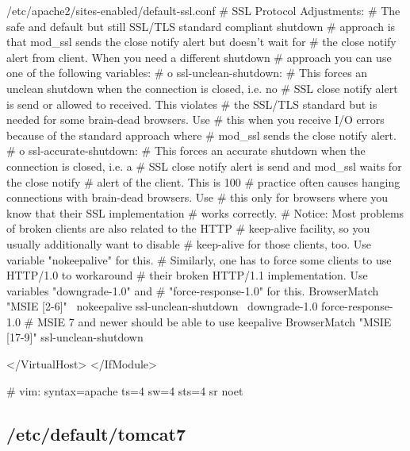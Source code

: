\begin{lstdump}[tabsize=2]{/etc/apache2/sites-enabled/default-ssl.conf}
		#   SSL Protocol Adjustments:
		#   The safe and default but still SSL/TLS standard compliant shutdown
		#   approach is that mod_ssl sends the close notify alert but doesn't wait for
		#   the close notify alert from client. When you need a different shutdown
		#   approach you can use one of the following variables:
		#   o ssl-unclean-shutdown:
		#	 This forces an unclean shutdown when the connection is closed, i.e. no
		#	 SSL close notify alert is send or allowed to received.  This violates
		#	 the SSL/TLS standard but is needed for some brain-dead browsers. Use
		#	 this when you receive I/O errors because of the standard approach where
		#	 mod_ssl sends the close notify alert.
		#   o ssl-accurate-shutdown:
		#	 This forces an accurate shutdown when the connection is closed, i.e. a
		#	 SSL close notify alert is send and mod_ssl waits for the close notify
		#	 alert of the client. This is 100%
		#	 practice often causes hanging connections with brain-dead browsers. Use
		#	 this only for browsers where you know that their SSL implementation
		#	 works correctly.
		#   Notice: Most problems of broken clients are also related to the HTTP
		#   keep-alive facility, so you usually additionally want to disable
		#   keep-alive for those clients, too. Use variable "nokeepalive" for this.
		#   Similarly, one has to force some clients to use HTTP/1.0 to workaround
		#   their broken HTTP/1.1 implementation. Use variables "downgrade-1.0" and
		#   "force-response-1.0" for this.
		BrowserMatch "MSIE [2-6]" \
				nokeepalive ssl-unclean-shutdown \
				downgrade-1.0 force-response-1.0
		# MSIE 7 and newer should be able to use keepalive
		BrowserMatch "MSIE [17-9]" ssl-unclean-shutdown

	</VirtualHost>
</IfModule>

# vim: syntax=apache ts=4 sw=4 sts=4 sr noet
\end{lstdump}

\subsection{/etc/default/tomcat7}\label{subsec:refcfg-tcdef}

